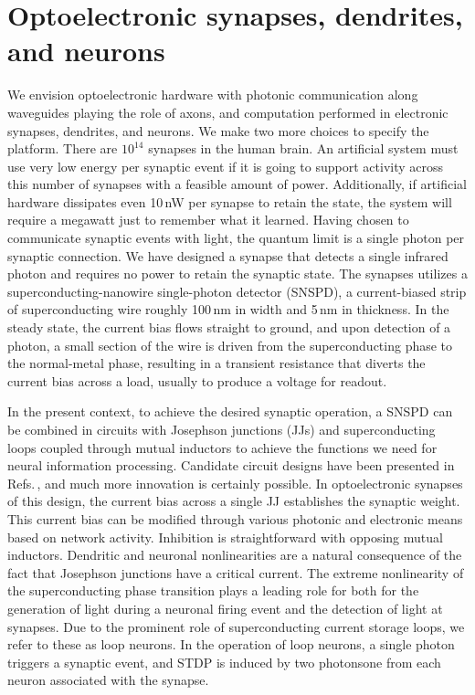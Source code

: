 \documentclass[twocolumn]{article}
\begin{document}
\section{\label{sec:synapsesDendritesAndNeurons}Optoelectronic synapses, dendrites, and neurons}
We envision optoelectronic hardware with photonic communication along waveguides playing the role of axons, and computation performed in electronic synapses, dendrites, and neurons. We make two more choices to specify the platform. There are $10^{14}$ synapses in the human brain. An artificial system must use very low energy per synaptic event if it is going to support activity across this number of synapses with a feasible amount of power. Additionally, if artificial hardware dissipates even 10\,nW per synapse to retain the state, the system will require a megawatt just to remember what it learned. Having chosen to communicate synaptic events with light, the quantum limit is a single photon per synaptic connection. We have designed a synapse that detects a single infrared photon and requires no power to retain the synaptic state. The synapses utilizes a superconducting-nanowire single-photon detector (SNSPD), a current-biased strip of superconducting wire roughly 100\,nm in width and 5\,nm in thickness. In the steady state, the current bias flows straight to ground, and upon detection of a photon, a small section of the wire is driven from the superconducting phase to the normal-metal phase, resulting in a transient resistance that diverts the current bias across a load, usually to produce a voltage for readout. 

In the present context, to achieve the desired synaptic operation, a SNSPD can be combined in circuits with Josephson junctions (JJs) and superconducting loops coupled through mutual inductors to achieve the functions we need for neural information processing. Candidate circuit designs have been presented in Refs.\,\cite{sh2018b,sh2018c,sh2018d,sh2018}, and much more innovation is certainly possible. In optoelectronic synapses of this design, the current bias across a single JJ establishes the synaptic weight. This current bias can be modified through various photonic and electronic means based on network activity. Inhibition is straightforward with opposing mutual inductors. Dendritic and neuronal nonlinearities are a natural consequence of the fact that Josephson junctions have a critical current. The extreme nonlinearity of the superconducting phase transition plays a leading role for both for the generation of light during a neuronal firing event and the detection of light at synapses. Due to the prominent role of superconducting current storage loops, we refer to these as loop neurons. In the operation of loop neurons, a single photon triggers a synaptic event, and STDP is induced by two photons\textemdash one from each neuron associated with the synapse.
\end{document}
